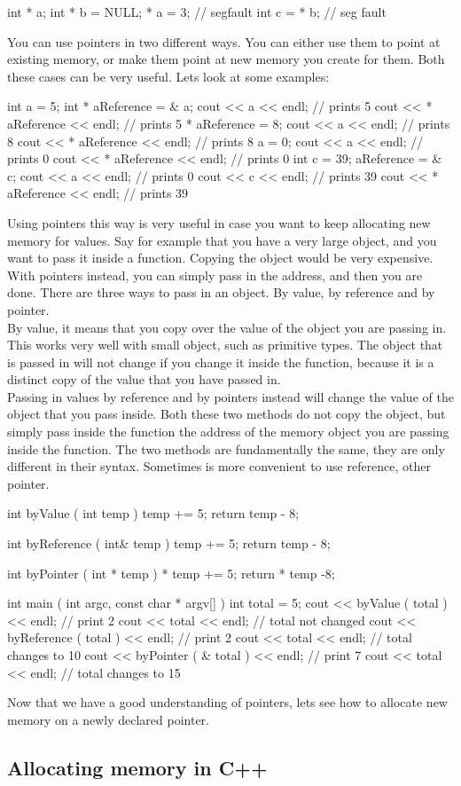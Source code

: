 \documentclass[../notebook.tex]{subfiles}
\begin{document}
\begin{cppcode}
  int * a;
  int * b = NULL;
  * a = 3; // segfault
  int c = * b; // seg fault
\end{cppcode}
You can use pointers in two different ways. You can either use them to point at existing memory, or make them point at new memory you create for them. Both these cases can be very useful. Lets look at some examples:
\begin{cppcode}
  int a = 5;
  int * aReference = & a;
  cout << a << endl; // prints 5
  cout << * aReference << endl; // prints 5
  * aReference = 8;
  cout << a << endl; // prints 8
  cout << * aReference << endl; // prints 8
  a = 0;
  cout << a << endl; // prints 0
  cout << * aReference << endl; // prints 0
  int c = 39;
  aReference = & c;
  cout << a << endl; // prints 0
  cout << c << endl; // prints 39
  cout << * aReference << endl; // prints 39
\end{cppcode}
Using pointers this way is very useful in case you want to keep allocating new memory for values. Say for example that you have a very large object, and you want to pass it inside a function. Copying the object would be very expensive. With pointers instead, you can simply pass in the address, and then you are done. There are three ways to pass in an object. By value, by reference and by pointer. \\
By value, it means that you copy over the value of the object you are passing in. This works very well with small object, such as primitive types. The object that is passed in will not change if you change it inside the function, because it is a distinct copy of the value that you have passed in. \\
Passing in values by reference and by pointers instead will change the value of the object that you pass inside. Both these two methods do not copy the object, but simply pass inside the function the address of the memory object you are passing inside the function. The two methods are fundamentally the same, they are only different in their syntax. Sometimes is more convenient to use reference, other pointer.
\begin{cppcode}
  int byValue ( int temp )
  {
    temp += 5;
    return temp - 8;
  }

  int byReference ( int& temp )
  {
    temp += 5;
    return temp - 8;
  }

  int byPointer ( int * temp )
  {
    * temp += 5;
    return * temp -8;
  }

  int main ( int argc, const char * argv[] ) 
  {
    int total = 5;
    cout << byValue     ( total )   << endl; // print 2
    cout << total                   << endl; // total not changed
    cout << byReference ( total )   << endl; // print 2
    cout << total                   << endl; // total changes to 10
    cout << byPointer   ( & total ) << endl; // print 7
    cout << total                   << endl; // total changes to 15
  }
\end{cppcode}
Now that we have a good understanding of pointers, lets see how to allocate new memory on a newly declared pointer.
\subsection{ Allocating memory in C++ } %
\label{sub: Allocating memory in C++ }

\end{document}
